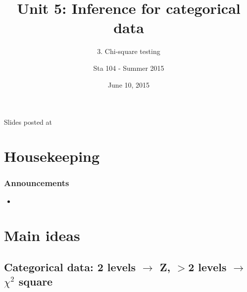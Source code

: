 \documentclass[slidestop,compress,mathserif,12pt,t,professionalfonts,xcolor=table]{beamer}
\title{Unit 5: Inference for categorical data}
\subtitle{3. Chi-square testing}
\author{Sta 104 - Summer 2015}
\date{June 10, 2015}
\institute{Duke University, Department of Statistical Science}
\begin{document}



\begin{frame}[plain]

\titlepage
\vfill
{\scriptsize {} \hfill Slides posted at  \webLink{\CourseSite}{\CourseSite}}
\addtocounter{framenumber}{-1} 

\end{frame}


\section{Housekeeping}


\begin{frame}
\frametitle{Announcements}

\begin{itemize}

\item 

\end{itemize}

\end{frame}


\section{Main ideas}


\subsection{Categorical data: 2 levels $\rightarrow$ Z, $>$2 levels $\rightarrow$ $\chi^2$ square}
\label{mi1}

\end{document}
